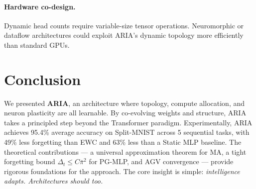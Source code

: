 \documentclass[11pt,a4paper]{article}
\theoremstyle{plain}
\theoremstyle{definition}
\theoremstyle{remark}
\newcommand{\pibar}{\bar{\pi}}
\begin{document}
\paragraph{Hardware co-design.} Dynamic head counts require variable-size tensor operations. Neuromorphic or dataflow architectures could exploit ARIA's dynamic topology more efficiently than standard GPUs.

\section{Conclusion}

We presented \textbf{ARIA}, an architecture where topology, compute allocation, and neuron plasticity are all learnable. By co-evolving weights and structure, ARIA takes a principled step beyond the Transformer paradigm. Experimentally, ARIA achieves 95.4\% average accuracy on Split-MNIST across 5 sequential tasks, with 49\% less forgetting than EWC and 63\% less than a Static MLP baseline. The theoretical contributions --- a universal approximation theorem for MA, a tight forgetting bound $\Delta_t \leq C\pibar^2$ for PG-MLP, and AGV convergence --- provide rigorous foundations for the approach. The core insight is simple: \emph{intelligence adapts. Architectures should too.}
\end{document}

